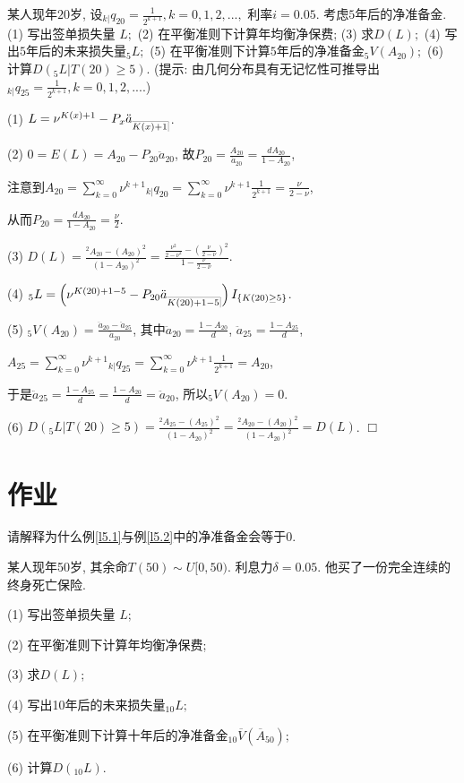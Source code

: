 \documentclass[a4paper,openany, 10pt]{ctexbook}
\makeatletter
\def\qed{\hfill$\Box$\medskip}
\def\z{\left}
\def\y{\right}
\DeclareRobustCommand{\annu}[1]{_{%
    \def\arraystretch{0}%
    \setlength\arraycolsep{1pt}%
    \setlength\arrayrulewidth{.2pt}%
    \begin{array}[b]{@{}c|}\hline
        \\[\arraycolsep]%
        \scriptstyle #1%
    \end{array}%
}}
\makeatother
\begin{document}
\begin{example}\label{l5.2}某人现年$20$岁, 设${}_{k|}q_{20}=\frac{1}{2^{k+1}},k=0,1,2,...,$ 利率$i=0.05.$ 考虑$5$年后的净准备金. (1) 写出签单损失量 $L;$ (2) 在平衡准则下计算年均衡净保费; (3) 求$D(L);$ (4) 写出$5$年后的未来损失量$_{5}L;$ (5) 在平衡准则下计算$5$年后的净准备金${}_{5}V( A_{20});$ (6) 计算$D({}_{5}L|T(20)\geq 5).$ (提示: 由几何分布具有无记忆性可推导出${}_{k|}q_{25}=\frac{1}{2^{k+1}},k=0,1,2,....$)
\end{example}
\solution
(1) $L = \nu^{K(x)+1} - P_x\ddot{a}_{\annu{K(x)+1}}$.

(2) $0=E(L)=A_{20}-P_{20}\ddot{a}_{20}$, 故$P_{20}=\frac{A_{20}}{\ddot{a}_{20}} = \frac{dA_{20}}{1-A_{20}}$,

注意到$A_{20}=\sum_{k=0}^{\infty}\nu^{k+1}{}_{k|}q_{20} = \sum_{k=0}^{\infty}\nu^{k+1}\frac{1}{2^{k+1}} = \frac{\nu}{2-\nu}$,

从而$P_{20}=\frac{dA_{20}}{1-A_{20}}=\frac{\nu}{2}.$

(3) $D(L)=\frac{^2A_{20}-(A_{20})^2}{(1-A_{20})^2}=\frac{\frac{\nu^{2}}{2-\nu^{2}}-\left(\frac{\nu}{2-\nu}\right)^{2}}{1-\frac{\nu}{2-\nu}}$.

(4) ${}_{5}L=\z(\nu^{K(20)+1-5}-P_{20}\ddot{a}_{\annu{K(20)+1-5}}\y)I_{\{K(20)\geq 5\}}$.

(5) ${}_{5}V(A_{20})=\frac{\ddot{a}_{20}-\ddot{a}_{25}}{\ddot{a}_{20}}$, 其中$\ddot{a}_{20}=\frac{1-A_{20}}{d}$, $\ddot{a}_{25}=\frac{1-A_{25}}{d}$,

$A_{25}=\sum_{k=0}^{\infty}\nu^{k+1}{}_{k|}q_{25} = \sum_{k=0}^{\infty}\nu^{k+1}\frac{1}{2^{k+1}} = A_{20}$,

于是$\ddot{a}_{25}=\frac{1-A_{25}}{d} = \frac{1-A_{20}}{d} = \ddot{a}_{20}$, 所以${}_{5}V(A_{20})=0$.

(6) $D({}_{5}L|T(20)\geq 5)=\frac{^2A_{25}-(A_{25})^2}{(1-A_{20})^2} = \frac{^2A_{20}-(A_{20})^2}{(1-A_{20})^2} = D(L)$.
\qed


\section{作业}


\begin{exs} 请解释为什么例\ref{l5.1}与例\ref{l5.2}中的净准备金会等于0.
\end{exs}
\begin{exs}
  某人现年50岁, 其余命$T(50)\sim U[0,50).$ 利息力$\delta=0.05.$ 他买了一份完全连续的终身死亡保险.

  (1) 写出签单损失量 $L;$

  (2) 在平衡准则下计算年均衡净保费;

  (3) 求$D(L);$

  (4) 写出10年后的未来损失量$_{10}L;$

  (5) 在平衡准则下计算十年后的净准备金${}_{10}\overline V(\overline A_{50});$

  (6) 计算$D({}_{10}L).$
\end{exs}
\end{document}
